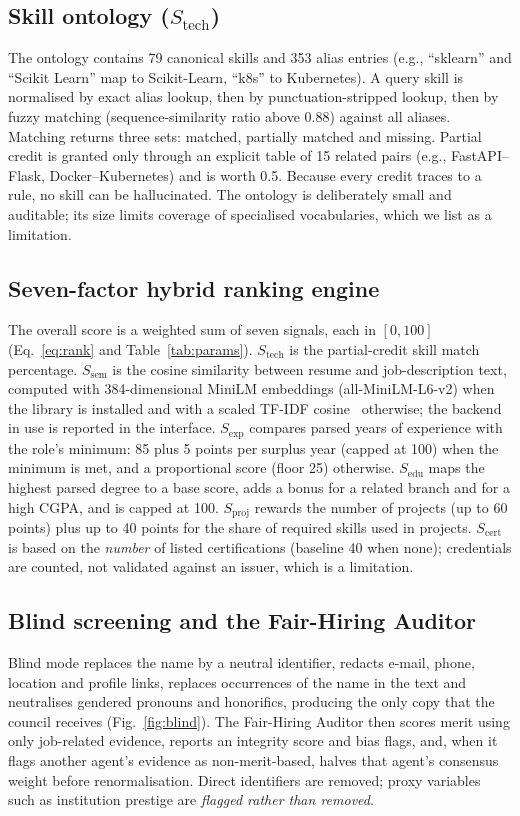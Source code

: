 \documentclass[conference]{IEEEtran}
\begin{document}
\subsection{Skill ontology ($S_{\mathrm{tech}}$)}
The ontology contains 79 canonical skills and 353 alias entries (e.g., ``sklearn'' and ``Scikit Learn'' map to Scikit-Learn, ``k8s'' to Kubernetes). A query skill is normalised by exact alias lookup, then by punctuation-stripped lookup, then by fuzzy matching (sequence-similarity ratio above 0.88) against all aliases. Matching returns three sets: matched, partially matched and missing. Partial credit is granted only through an explicit table of 15 related pairs (e.g., FastAPI--Flask, Docker--Kubernetes) and is worth 0.5. Because every credit traces to a rule, no skill can be hallucinated. The ontology is deliberately small and auditable; its size limits coverage of specialised vocabularies, which we list as a limitation.

\subsection{Seven-factor hybrid ranking engine}
The overall score is a weighted sum of seven signals, each in $[0,100]$ (Eq.~\ref{eq:rank} and Table~\ref{tab:params}). $S_{\mathrm{tech}}$ is the partial-credit skill match percentage. $S_{\mathrm{sem}}$ is the cosine similarity between resume and job-description text, computed with 384-dimensional MiniLM embeddings (all-MiniLM-L6-v2) when the library is installed and with a scaled TF-IDF cosine~\cite{sklearn} otherwise; the backend in use is reported in the interface. $S_{\mathrm{exp}}$ compares parsed years of experience with the role's minimum: 85 plus 5 points per surplus year (capped at 100) when the minimum is met, and a proportional score (floor 25) otherwise. $S_{\mathrm{edu}}$ maps the highest parsed degree to a base score, adds a bonus for a related branch and for a high CGPA, and is capped at 100. $S_{\mathrm{proj}}$ rewards the number of projects (up to 60 points) plus up to 40 points for the share of required skills used in projects. $S_{\mathrm{cert}}$ is based on the \emph{number} of listed certifications (baseline 40 when none); credentials are counted, not validated against an issuer, which is a limitation.

\subsection{Blind screening and the Fair-Hiring Auditor}
Blind mode replaces the name by a neutral identifier, redacts e-mail, phone, location and profile links, replaces occurrences of the name in the text and neutralises gendered pronouns and honorifics, producing the only copy that the council receives (Fig.~\ref{fig:blind}). The Fair-Hiring Auditor then scores merit using only job-related evidence, reports an integrity score and bias flags, and, when it flags another agent's evidence as non-merit-based, halves that agent's consensus weight before renormalisation. Direct identifiers are removed; proxy variables such as institution prestige are \emph{flagged rather than removed}.
\end{document}
